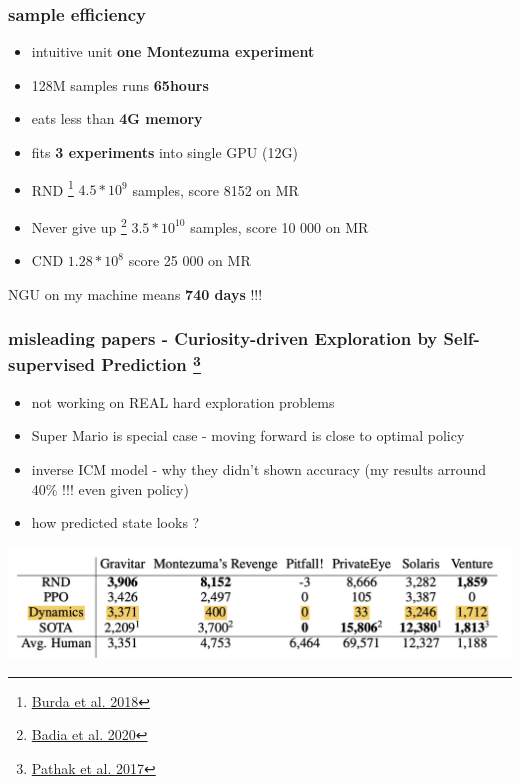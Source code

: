 \documentclass{beamer}
\begin{document}
\begin{frame}
  
  \frametitle{sample efficiency}

  \begin{itemize}
    \item intuitive unit {\bf one Montezuma experiment}
    \item 128M samples runs {\bf 65hours}
    \item eats less than {\bf 4G memory}
    \item fits {\bf 3 experiments} into single GPU (12G)
  \end{itemize}

  \bigskip

  \begin{itemize}
    \item RND \footnote{\href{https://arxiv.org/pdf/1810.12894.pdf}{Burda et al. 2018}} $4.5*10^9$ samples, score 8152 on MR
    \item Never give up \footnote{\href{https://arxiv.org/pdf/2002.06038.pdf}{Badia et al. 2020}} $3.5*10^{10}$ samples, score 10 000 on MR
    \item CND $1.28*10^8$ score 25 000 on MR 
  \end{itemize}

  NGU on my machine means {\bf 740 days} !!!
\end{frame}


\begin{frame}
  
  \frametitle{misleading papers - Curiosity-driven Exploration by Self-supervised Prediction \footnote{\href{https://arxiv.org/abs/1705.05363}{Pathak et al. 2017}}}
  
  \begin{itemize}
    \item not working on REAL hard exploration problems
    \item Super Mario is special case - moving forward is close to optimal policy
    \item inverse ICM model - why they didn't shown accuracy (my results arround 40\% !!! even given policy)
    \item how predicted state looks ?
  \end{itemize}

  \centering
  \includegraphics[scale=0.25]{../papers_captions/icm_a.png}

\end{frame}
\end{document}
